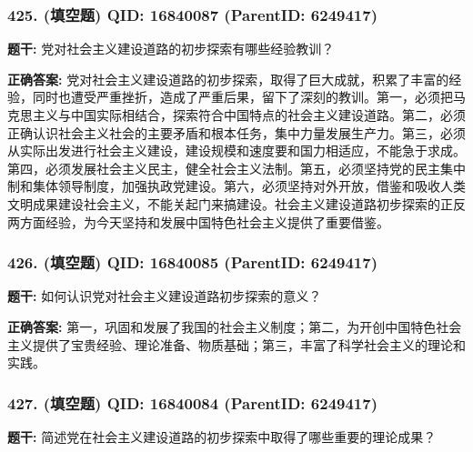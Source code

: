 \documentclass[12pt,UTF8]{ctexart}
\begin{document}
\vspace{0.3em}\hrulefill\vspace{0.7em}

\subsubsection*{425. (填空题) \small QID: 16840087 (ParentID: 6249417)}

\textbf{题干:}
党对社会主义建设道路的初步探索有哪些经验教训？



\textbf{正确答案:}
党对社会主义建设道路的初步探索，取得了巨大成就，积累了丰富的经验，同时也遭受严重挫折，造成了严重后果，留下了深刻的教训。第一，必须把马克思主义与中国实际相结合，探索符合中国特点的社会主义建设道路。第二，必须正确认识社会主义社会的主要矛盾和根本任务，集中力量发展生产力。第三，必须从实际出发进行社会主义建设，建设规模和速度要和国力相适应，不能急于求成。第四，必须发展社会主义民主，健全社会主义法制。第五，必须坚持党的民主集中制和集体领导制度，加强执政党建设。第六，必须坚持对外开放，借鉴和吸收人类文明成果建设社会主义，不能关起门来搞建设。社会主义建设道路初步探索的正反两方面经验，为今天坚持和发展中国特色社会主义提供了重要借鉴。

\vspace{0.3em}\hrulefill\vspace{0.7em}

\subsubsection*{426. (填空题) \small QID: 16840085 (ParentID: 6249417)}

\textbf{题干:}
如何认识党对社会主义建设道路初步探索的意义？



\textbf{正确答案:}
第一，巩固和发展了我国的社会主义制度；第二，为开创中国特色社会主义提供了宝贵经验、理论准备、物质基础；第三，丰富了科学社会主义的理论和实践。

\vspace{0.3em}\hrulefill\vspace{0.7em}

\subsubsection*{427. (填空题) \small QID: 16840084 (ParentID: 6249417)}

\textbf{题干:}
简述党在社会主义建设道路的初步探索中取得了哪些重要的理论成果？
\end{document}
